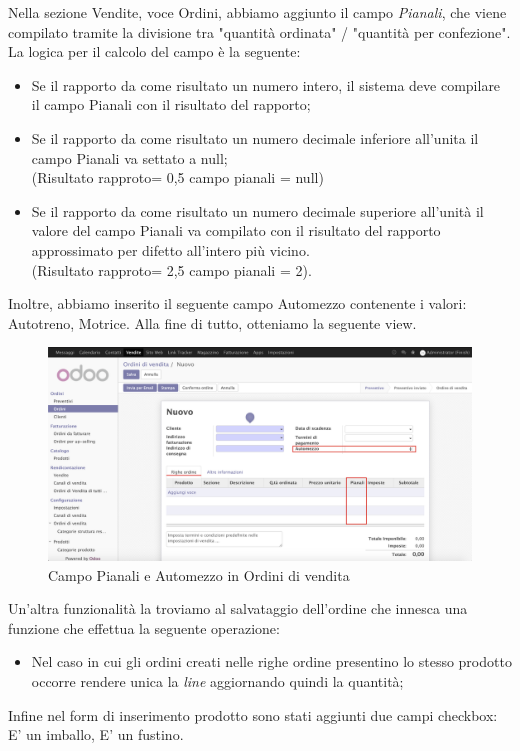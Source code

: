 Nella sezione Vendite, voce Ordini, abbiamo aggiunto il campo \textit{Pianali}, che viene compilato tramite la divisione tra "quantità ordinata" / "quantità per confezione".
La logica per il calcolo del campo è la seguente:
\begin{itemize}
	\item Se il rapporto da come risultato un numero intero, il sistema deve compilare il campo Pianali con il risultato del rapporto;
	\item Se il rapporto da come risultato un numero decimale inferiore all'unita il campo Pianali va settato a null;
	\\ (Risultato rapproto= 0,5 campo pianali = null)
	\item Se il rapporto da come risultato un numero decimale superiore all'unità il valore del campo Pianali va compilato con il risultato del rapporto approssimato per difetto all'intero più vicino. \\
	(Risultato rapproto= 2,5 campo pianali = 2).
\end{itemize}
Inoltre, abbiamo inserito il seguente campo Automezzo contenente i valori:\\ Autotreno, Motrice. Alla fine di tutto, otteniamo la seguente view.
\vspace*{0.5cm}
\begin{figure}[H]
	\begin{center} \includegraphics[scale=0.3]{figures/pianali}
		\caption[Campo Pianali e Automezzo in Ordini di vendita]{Campo Pianali e Automezzo in Ordini di vendita}
		\label{fig:pianali}
	\end{center}
\end{figure}

Un'altra funzionalità la troviamo al salvataggio dell'ordine che innesca una funzione che effettua la seguente operazione:
\begin{itemize}
\item Nel caso in cui gli ordini creati nelle righe ordine presentino lo stesso prodotto occorre rendere unica la \textit{line} aggiornando quindi la quantità;
\end{itemize}
\newpage
Infine nel form di inserimento prodotto sono stati aggiunti due campi checkbox: E' un imballo, E' un fustino.

